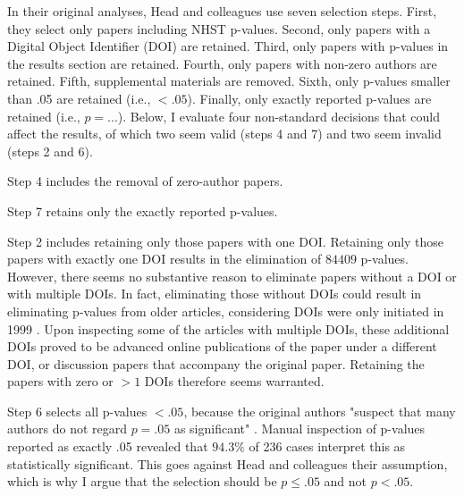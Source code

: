 In their original analyses, Head and colleagues use seven selection steps. First, they select only papers including NHST p-values. Second, only papers with a Digital Object Identifier (DOI) are retained. Third, only papers with p-values in the results section are retained. Fourth, only papers with non-zero authors are retained. Fifth, supplemental materials are removed. Sixth, only p-values smaller than .05 are retained (i.e., $<.05$). Finally, only exactly reported p-values are retained (i.e., $p=...$). Below, I evaluate four non-standard decisions that could affect the results, of which two seem valid (steps 4 and 7) and two seem invalid (steps 2 and 6).

Step 4 includes the removal of zero-author papers.

Step 7 retains only the exactly reported p-values.

Step 2 includes retaining only those papers with one DOI. Retaining only those papers with exactly one DOI results in the elimination of $84409$ p-values. However, there seems no substantive reason to eliminate papers without a DOI or with multiple DOIs. In fact, eliminating those without DOIs could result in eliminating p-values from older articles, considering DOIs were only initiated in 1999 \cite{Crossre2009}. Upon inspecting some of the articles with multiple DOIs, these additional DOIs proved to be advanced online publications of the paper under a different DOI, or discussion papers that accompany the original paper. Retaining the papers with zero or $>1$ DOIs therefore seems warranted.

Step 6 selects all p-values $<.05$, because the original authors "suspect that many authors do not regard $p=.05$ as significant" \cite{Head2015}. Manual inspection of p-values reported as exactly .05 revealed that $94.3\%$ of 236 cases interpret this as statistically significant. This goes against Head and colleagues their assumption, which is why I argue that the selection should be $p\leq.05$ and not $p<.05$.
